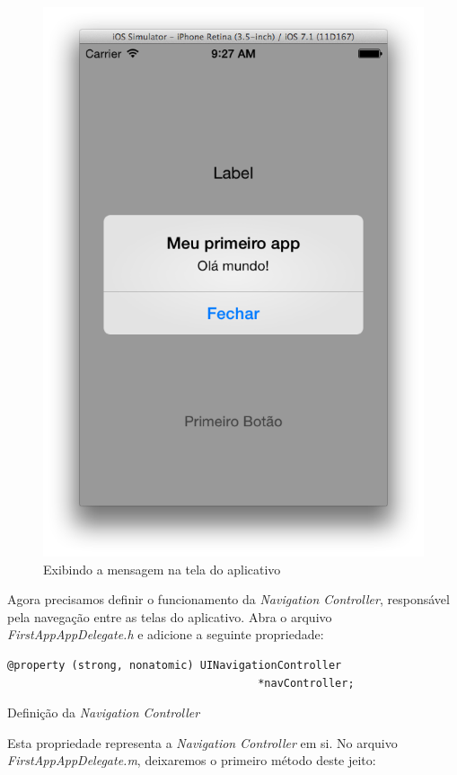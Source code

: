 \documentclass[a4paper,12pt,brazil,oneside]{book}
\begin{document}
\begin{figure}[H]
  \centering
  \includegraphics[width=.55\textwidth]{figuras/3/tela_novo_projeto_25.png}
  \caption{Exibindo a mensagem na tela do aplicativo}
  \label{fig:a}
\end{figure}


Agora precisamos definir o funcionamento da \emph{Navigation Controller}, responsável pela navegação entre as telas do aplicativo. Abra o arquivo \emph{FirstAppAppDelegate.h} e adicione a seguinte propriedade:

\begin{listing}
\begin{verbatim}
@property (strong, nonatomic) UINavigationController
									   *navController;
\end{verbatim}
\caption{Definição da \emph{Navigation Controller}}
\end{listing}


Esta propriedade representa a \emph{Navigation Controller} em si. No arquivo \emph{FirstAppAppDelegate.m}, deixaremos o primeiro método deste jeito:
\end{document}
